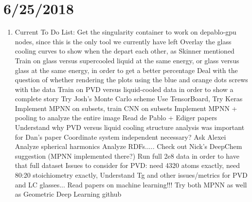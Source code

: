 \documentclass[12pt,reqno]{amsart}
\numberwithin{equation}{section}
\begin{document}
\section{6/25/2018}
\begin{enumerate}
\item Current To Do List:
\subitem Get the singularity container to work on depablo-gpu nodes, since this is the only tool we currently have left  
\subitem Overlay the glass cooling curves to show when the depart each other, as Skinner mentioned
\subitem Train on glass versus supercooled liquid at the same energy, or glass versus glass at the same energy, in order to get a better percentage
\subitem Deal with the question of whether rendering the plots using the blue and orange dots screws with the data
\subitem Train on PVD versus liquid-cooled data in order to show a complete story
\subitem Try Josh's Monte Carlo scheme 
\subitem Use TensorBoard, Try Keras
\subitem Implement MPNN on subsets, train CNN on subsets
\subitem Implement MPNN + pooling to analyze the entire image 
\subitem Read de Pablo + Ediger papers
\subitem Understand why PVD versus liquid cooling structure analysis was important for Dan's paper
\subitem Coordinate system independent necessary?  Ask Alexei 
\subitem Analyze spherical harmonics
\subitem Analyze RDFs.....
\subitem Check out Nick's DeepChem suggestion (MPNN implemented there?)
\subitem Run full 2e8 data in order to have that full dataset
\subitem Issues to consider for PVD: need 4320 atoms exactly, need 80:20 stoichiometry exactly, 
\subitem Understand Tg and other issues/metrics for PVD and LC glasses...
\subitem Read papers on machine learning!!! 
\subitem Try both MPNN as well as Geometric Deep Learning github



\end{enumerate}
\end{document}
